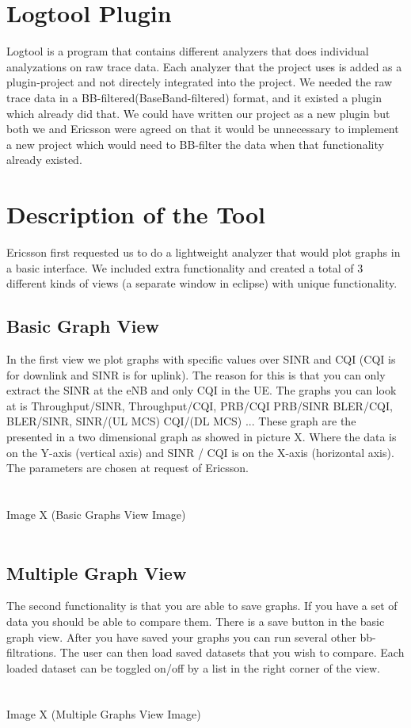 \documentclass[cropmarks, frame, english]{idamasterthesis}
\begin{document}
\section{Logtool Plugin}
Logtool is a program that contains different analyzers that does individual analyzations on raw trace data. Each analyzer that the project uses is added as a plugin-project and not directely integrated into the project. We needed the raw trace data in a BB-filtered(BaseBand-filtered) format, and it existed a plugin which already did that. We could have written our project as a new plugin but both we and Ericsson were agreed on that it would be unnecessary to implement a new project which would need to BB-filter the data when that functionality already existed. 
 
\section{Description of the Tool}
Ericsson first requested us to do a lightweight analyzer that would plot graphs in a basic interface. We included extra functionality and created a total of 3 different kinds of views (a separate window in eclipse) with unique functionality. 

\subsection{Basic Graph View}
 In the first view we plot graphs with specific values over SINR and CQI (CQI is for downlink and SINR is for uplink). The reason for this is that you can only extract the SINR at the eNB and only CQI in the UE. The graphs you can look at is Throughput/SINR, Throughput/CQI, PRB/CQI PRB/SINR BLER/CQI, BLER/SINR, SINR/(UL MCS) CQI/(DL MCS) ... These graph are the presented in a two dimensional graph as showed in picture X. Where the data is on the Y-axis (vertical axis) and SINR / CQI is on the X-axis (horizontal axis). The parameters are chosen at request of Ericsson. 
\\
\\ 
\\
		Image X (Basic Graphs View Image)
\\
\\

\subsection{Multiple Graph View}
The second functionality is that you are able to save graphs. If you have a set of data you should be able to compare them. There is a save button in the basic graph view. After you have saved your graphs you can run several other bb-filtrations. The user can then load saved datasets that you wish to compare. Each loaded dataset can be toggled on/off by a list in the right corner of the view.
\\
\\ 
\\
		Image X (Multiple Graphs View Image)
\\
\\
\end{document}
